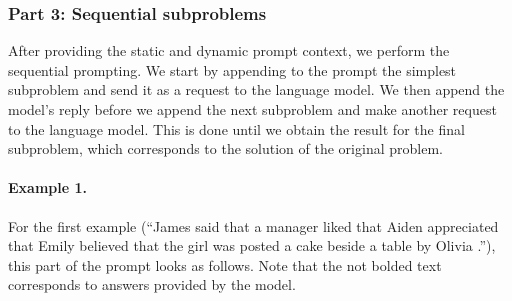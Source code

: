 \documentclass{article} \usepackage{iclr2022_conference,times}
\begin{document}
\subsubsection{Part 3: Sequential subproblems}
After providing the static and dynamic prompt context, we perform the sequential prompting. We start by appending to the prompt the simplest subproblem and send it as a request to the language model. We then append the model's reply before we append the next subproblem and make another request to the language model. This is done until we obtain the result for the final subproblem, which corresponds to the solution of the original problem.

\paragraph{Example 1.}
For the first example (``James said that a manager liked that Aiden appreciated that Emily believed that the girl was posted a cake beside a table by Olivia .''), this part of the prompt looks as follows. Note that the not bolded text corresponds to answers provided by the model.
\end{document}
